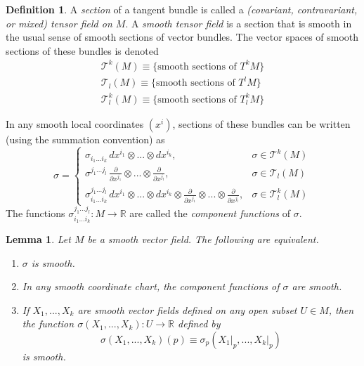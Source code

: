\documentclass{article}
\newtheorem{lemma}[theorem]{Lemma}
\theoremstyle{remark}
\theoremstyle{definition}
\newtheorem{definition}{Definition}[section]
\begin{document}
\begin{definition}
A \textit{section} of a tangent bundle is called a \textit{(covariant, contravariant, or mixed) tensor field on $M$}. A \textit{smooth tensor field} is a section that is smooth in the usual sense of smooth sections of vector bundles. The vector spaces of smooth sections of these bundles is denoted
\begin{align*}
    \mathcal{T}^k (M) \equiv \{\text{smooth sections of } T^k M \} \\
    \mathcal{T}_l (M) \equiv \{\text{smooth sections of } T^l M \} \\
    \mathcal{T}^k_l (M) \equiv \{\text{smooth sections of } T^k_l M \}
\end{align*}
\end{definition}

In any smooth local coordinates $(x^i)$, sections of these bundles can be written (using the summation convention) as
\[\sigma = \begin{cases}
      \sigma_{i_1 ... i_k} \, dx^{i_1} \otimes ... \otimes dx^{i_k}, & \sigma \in \mathcal{T}^k (M) \\
      \sigma^{j_1 ... j_l} \, \frac{\partial}{\partial x^{j_1}} \otimes ... \otimes \frac{\partial}{\partial x^{j_l}}, & \sigma \in \mathcal{T}_l (M) \\
      \sigma_{i_1 ... i_k}^{j_1 ... j_l} \, dx^{i_1} \otimes ... \otimes dx^{i_k} \otimes \frac{\partial}{\partial x^{j_1}} \otimes ... \otimes \frac{\partial}{\partial x^{j_l}}, & \sigma \in \mathcal{T}^k_l (M)
\end{cases}\]
The functions $\sigma_{i_1 ... i_k}^{j_1 ... j_l} : M \longrightarrow \mathbb{R}$ are called the \textit{component functions} of $\sigma$. 

\begin{lemma}
Let $M$ be a smooth vector field. The following are equivalent.
\begin{enumerate}
    \item $\sigma$ is smooth. 
    \item In any smooth coordinate chart, the component functions of $\sigma$ are smooth. 
    \item If $X_1, ..., X_k$ are smooth vector fields defined on any open subset $U \in M$, then the function $\sigma(X_1, ..., X_k): U \longrightarrow \mathbb{R}$ defined by 
    \[\sigma(X_1, ..., X_k) (p) \equiv \sigma_p (X_1 \big|_p, ..., X_k \big|_p)\]
    is smooth. 
\end{enumerate}
\end{lemma}
\end{document}
